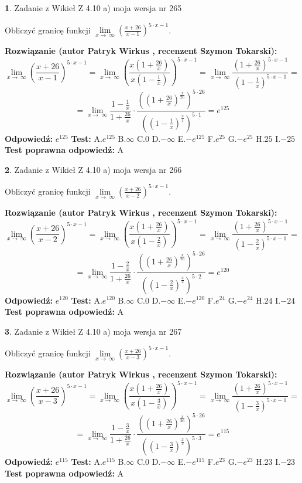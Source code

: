 \documentclass[12pt, a4paper]{article}
\theoremstyle{definition} %
\newtheorem{zad}{}
\newcommand{\zadStart}[1]{\begin{zad}#1\newline}
\newcommand{\zadStop}{\end{zad}}
\newcommand{\rozwStart}[2]{\noindent \textbf{Rozwiązanie (autor #1 , recenzent #2): }\newline}
\newcommand{\rozwStop}{\newline}
\newcommand{\odpStart}{\noindent \textbf{Odpowiedź:}\newline}
\newcommand{\odpStop}{\newline}
\newcommand{\testStart}{\noindent \textbf{Test:}\newline}
\newcommand{\testStop}{\newline}
\newcommand{\kluczStart}{\noindent \textbf{Test poprawna odpowiedź:}\newline}
\newcommand{\kluczStop}{\newline}
\begin{document}
\zadStart{Zadanie z Wikieł Z 4.10 a) moja wersja nr 265}

Obliczyć granicę funkcji  $\lim\limits_{x\to\ \infty}(\frac{x+26}{x-1})^{5\cdot x-1}$.
\zadStop
\rozwStart{Patryk Wirkus}{Szymon Tokarski}
$$\lim\limits_{x\to\ \infty}(\frac{x+26}{x-1})^{5\cdot x-1} = \lim\limits_{x\to\ \infty}(\frac{x(1+\frac{26}{x})}{x(1-\frac{1}{x})})^{5\cdot x-1}=\lim\limits_{x\to\ \infty}\frac{(1+\frac{26}{x})^{5\cdot x-1}}{(1-\frac{1}{x})^{5\cdot x-1}}=$$
$$=\lim\limits_{x\to\ \infty}\frac{1-\frac{1}{x}}{1+\frac{26}{x}}\cdot\frac{((1+\frac{26}{x})^{\frac{x}{26}})^{5\cdot26}}{((1-\frac{1}{x})^{\frac{x}{1}})^{5\cdot1}}=e^{125}$$
\rozwStop
\odpStart
$e^{125}$
\odpStop
\testStart
A.$e^{125}$ B.$\infty$ C.$0$ D.$-\infty$ E.$-e^{125}$
F.$e^{25}$ G.$-e^{25}$
H.$25$
I.$-25$
\testStop
\kluczStart
A
\kluczStop



\zadStart{Zadanie z Wikieł Z 4.10 a) moja wersja nr 266}

Obliczyć granicę funkcji  $\lim\limits_{x\to\ \infty}(\frac{x+26}{x-2})^{5\cdot x-1}$.
\zadStop
\rozwStart{Patryk Wirkus}{Szymon Tokarski}
$$\lim\limits_{x\to\ \infty}(\frac{x+26}{x-2})^{5\cdot x-1} = \lim\limits_{x\to\ \infty}(\frac{x(1+\frac{26}{x})}{x(1-\frac{2}{x})})^{5\cdot x-1}=\lim\limits_{x\to\ \infty}\frac{(1+\frac{26}{x})^{5\cdot x-1}}{(1-\frac{2}{x})^{5\cdot x-1}}=$$
$$=\lim\limits_{x\to\ \infty}\frac{1-\frac{2}{x}}{1+\frac{26}{x}}\cdot\frac{((1+\frac{26}{x})^{\frac{x}{26}})^{5\cdot26}}{((1-\frac{2}{x})^{\frac{x}{2}})^{5\cdot2}}=e^{120}$$
\rozwStop
\odpStart
$e^{120}$
\odpStop
\testStart
A.$e^{120}$ B.$\infty$ C.$0$ D.$-\infty$ E.$-e^{120}$
F.$e^{24}$ G.$-e^{24}$
H.$24$
I.$-24$
\testStop
\kluczStart
A
\kluczStop



\zadStart{Zadanie z Wikieł Z 4.10 a) moja wersja nr 267}

Obliczyć granicę funkcji  $\lim\limits_{x\to\ \infty}(\frac{x+26}{x-3})^{5\cdot x-1}$.
\zadStop
\rozwStart{Patryk Wirkus}{Szymon Tokarski}
$$\lim\limits_{x\to\ \infty}(\frac{x+26}{x-3})^{5\cdot x-1} = \lim\limits_{x\to\ \infty}(\frac{x(1+\frac{26}{x})}{x(1-\frac{3}{x})})^{5\cdot x-1}=\lim\limits_{x\to\ \infty}\frac{(1+\frac{26}{x})^{5\cdot x-1}}{(1-\frac{3}{x})^{5\cdot x-1}}=$$
$$=\lim\limits_{x\to\ \infty}\frac{1-\frac{3}{x}}{1+\frac{26}{x}}\cdot\frac{((1+\frac{26}{x})^{\frac{x}{26}})^{5\cdot26}}{((1-\frac{3}{x})^{\frac{x}{3}})^{5\cdot3}}=e^{115}$$
\rozwStop
\odpStart
$e^{115}$
\odpStop
\testStart
A.$e^{115}$ B.$\infty$ C.$0$ D.$-\infty$ E.$-e^{115}$
F.$e^{23}$ G.$-e^{23}$
H.$23$
I.$-23$
\testStop
\kluczStart
A
\kluczStop
\end{document}
